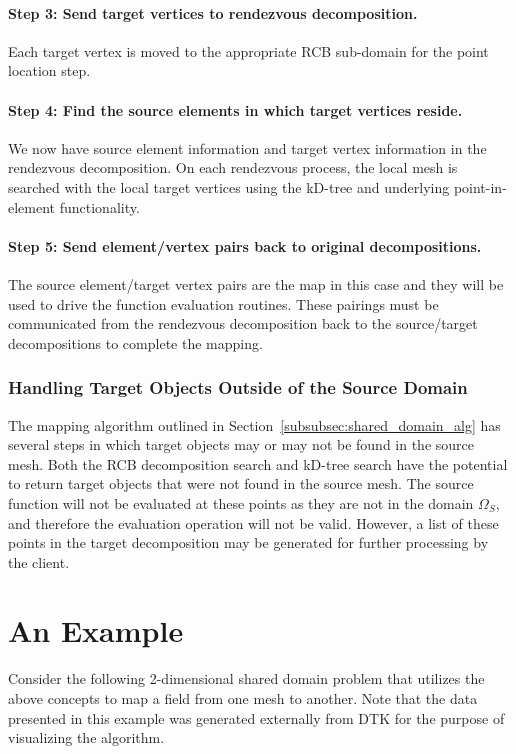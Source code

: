 \documentclass[letterpaper,12pt]{article}
\begin{document}
\paragraph{Step 3: Send target vertices to rendezvous decomposition.}
Each target vertex is moved to the appropriate RCB sub-domain for the
point location step.

\paragraph{Step 4: Find the source elements in which target vertices reside.}
We now have source element information and target vertex information
in the rendezvous decomposition. On each rendezvous process, the local
mesh is searched with the local target vertices using the kD-tree and
underlying point-in-element functionality.

\paragraph{Step 5: Send element/vertex pairs back to original
  decompositions.}  The source element/target vertex pairs are the map
in this case and they will be used to drive the function evaluation
routines. These pairings must be communicated from the rendezvous
decomposition back to the source/target decompositions to complete the
mapping.

\subsubsection{Handling Target Objects Outside of the Source Domain}
\label{subsubsec:shared_domain_missed_points}
The mapping algorithm outlined in
Section~\ref{subsubsec:shared_domain_alg} has several steps in which
target objects may or may not be found in the source mesh. Both the
RCB decomposition search and kD-tree search have the potential to
return target objects that were not found in the source mesh. The
source function will not be evaluated at these points as they are not
in the domain $\Omega_S$, and therefore the evaluation operation will
not be valid. However, a list of these points in the target
decomposition may be generated for further processing by the client.

\clearpage

\section{An Example}
Consider the following 2-dimensional shared domain problem that
utilizes the above concepts to map a field from one mesh to
another. Note that the data presented in this example was generated
externally from DTK for the purpose of visualizing the algorithm.
\end{document}
